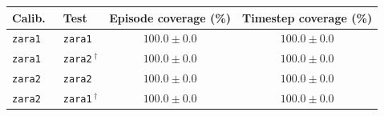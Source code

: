 \begin{tabular}{llcc}
\hline
Calib.\ & Test & Episode coverage (\%) & Timestep coverage (\%) \\
\hline
\texttt{zara1} & \texttt{zara1} & $100.0\pm0.0$ & $100.0\pm0.0$ \\
\texttt{zara1} & \texttt{zara2}\,$^{\dagger}$ & $100.0\pm0.0$ & $100.0\pm0.0$ \\
\texttt{zara2} & \texttt{zara2} & $100.0\pm0.0$ & $100.0\pm0.0$ \\
\texttt{zara2} & \texttt{zara1}\,$^{\dagger}$ & $100.0\pm0.0$ & $100.0\pm0.0$ \\
\hline
\end{tabular}
